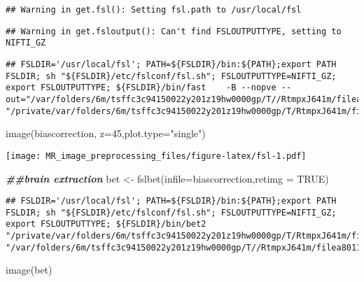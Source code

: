 \documentclass[
]{article}
\newenvironment{Shaded}{\begin{snugshade}}{\end{snugshade}}
\newcommand{\AttributeTok}[1]{\textcolor[rgb]{0.77,0.63,0.00}{#1}}
\newcommand{\ConstantTok}[1]{\textcolor[rgb]{0.00,0.00,0.00}{#1}}
\newcommand{\DecValTok}[1]{\textcolor[rgb]{0.00,0.00,0.81}{#1}}
\newcommand{\DocumentationTok}[1]{\textcolor[rgb]{0.56,0.35,0.01}{\textbf{\textit{#1}}}}
\newcommand{\FunctionTok}[1]{\textcolor[rgb]{0.00,0.00,0.00}{#1}}
\newcommand{\NormalTok}[1]{#1}
\newcommand{\OtherTok}[1]{\textcolor[rgb]{0.56,0.35,0.01}{#1}}
\newcommand{\StringTok}[1]{\textcolor[rgb]{0.31,0.60,0.02}{#1}}
\begin{document}
\begin{verbatim}
## Warning in get.fsl(): Setting fsl.path to /usr/local/fsl
\end{verbatim}

\begin{verbatim}
## Warning in get.fsloutput(): Can't find FSLOUTPUTTYPE, setting to NIFTI_GZ
\end{verbatim}

\begin{verbatim}
## FSLDIR='/usr/local/fsl'; PATH=${FSLDIR}/bin:${PATH};export PATH FSLDIR; sh "${FSLDIR}/etc/fslconf/fsl.sh"; FSLOUTPUTTYPE=NIFTI_GZ; export FSLOUTPUTTYPE; ${FSLDIR}/bin/fast    -B --nopve --out="/var/folders/6m/tsffc3c94150022y201z19hw0000gp/T//RtmpxJ641m/filea8014d16c788" "/private/var/folders/6m/tsffc3c94150022y201z19hw0000gp/T/RtmpxJ641m/filea8012982d792.nii.gz";
\end{verbatim}

\begin{Shaded}
\begin{Highlighting}[]
\FunctionTok{image}\NormalTok{(biascorrection, }\AttributeTok{z=}\DecValTok{45}\NormalTok{,}\AttributeTok{plot.type=}\StringTok{"single"}\NormalTok{) }
\end{Highlighting}
\end{Shaded}

\texttt{[image: MR\_image\_preprocessing\_files/figure-latex/fsl-1.pdf]}

\begin{Shaded}
\begin{Highlighting}[]
\DocumentationTok{\#\#brain extraction}
\NormalTok{bet }\OtherTok{\textless{}{-}} \FunctionTok{fslbet}\NormalTok{(}\AttributeTok{infile=}\NormalTok{biascorrection,}\AttributeTok{retimg =} \ConstantTok{TRUE}\NormalTok{)}
\end{Highlighting}
\end{Shaded}

\begin{verbatim}
## FSLDIR='/usr/local/fsl'; PATH=${FSLDIR}/bin:${PATH};export PATH FSLDIR; sh "${FSLDIR}/etc/fslconf/fsl.sh"; FSLOUTPUTTYPE=NIFTI_GZ; export FSLOUTPUTTYPE; ${FSLDIR}/bin/bet2 "/private/var/folders/6m/tsffc3c94150022y201z19hw0000gp/T/RtmpxJ641m/filea801117a858e.nii.gz" "/var/folders/6m/tsffc3c94150022y201z19hw0000gp/T//RtmpxJ641m/filea8011285d942"
\end{verbatim}

\begin{Shaded}
\begin{Highlighting}[]
\FunctionTok{image}\NormalTok{(bet)}
\end{Highlighting}
\end{Shaded}
\end{document}
